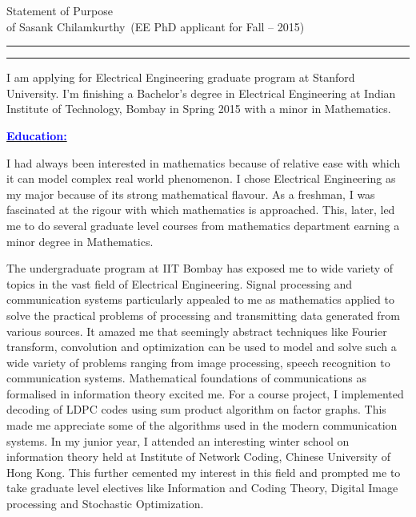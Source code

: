 \documentclass[11pt]{article}
\newcommand{\soptitle}{Statement of Purpose}
\newcommand{\yourname}{Sasank Chilamkurthy}
\newcommand{\statement}[1]{\par\medskip
  \underline{\textcolor{blue}{\textbf{#1:}}}\space
}
\begin{document}
\begin{center}
\LARGE\soptitle\\
\large of \yourname\ (EE PhD applicant for Fall -- 2015)
\end{center}

\hrule
\vspace{1pt}
\hrule height 1pt

\bigskip
I am applying for Electrical Engineering graduate program at Stanford University. 
I'm finishing a Bachelor's degree in Electrical Engineering at Indian Institute of Technology, Bombay in Spring 2015 with a minor in Mathematics.
\statement{Education}
I had always been interested in mathematics because of relative ease with which it can model complex real world phenomenon. 
I chose Electrical Engineering as my major because of its strong mathematical flavour. 
As a freshman, I was fascinated at the rigour with which mathematics is approached. 
This, later, led me to do several graduate level courses from mathematics department earning a minor degree in Mathematics. 

The undergraduate program at IIT Bombay has exposed me to wide variety of topics in the vast field of Electrical Engineering. 
Signal processing and communication systems particularly appealed to me as mathematics applied to solve the practical problems of processing and transmitting data generated from various sources. 
It amazed me that seemingly abstract techniques like Fourier transform, convolution and optimization can be used to model and solve such a wide variety of problems ranging from image processing, speech recognition to communication systems.
Mathematical foundations of communications as formalised in information theory excited me. 
For a course project, I implemented decoding of LDPC codes using sum product algorithm on factor graphs. 
This made me appreciate some of the algorithms used in the modern communication systems. 
In my junior year, I attended an interesting winter school on information theory held at Institute of Network Coding, Chinese University of Hong Kong. 
This further cemented my interest in this field and prompted me to take graduate level electives like Information and Coding Theory, Digital Image processing and Stochastic Optimization.
\end{document}
